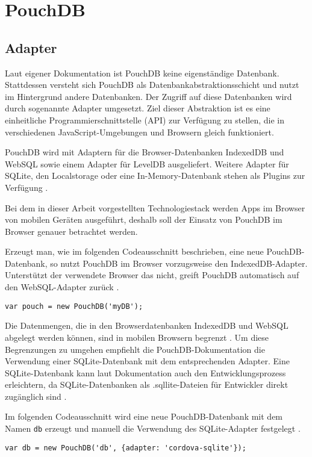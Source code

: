 \chapter{PouchDB}
\label{PouchDB}

\section{Adapter}
\label{Adapter}

Laut eigener Dokumentation ist PouchDB keine eigenständige Datenbank. Stattdessen versteht sich PouchDB als Datenbankabstraktionsschicht und nutzt im Hintergrund andere Datenbanken. Der Zugriff auf diese Datenbanken wird durch sogenannte Adapter umgesetzt. Ziel dieser Abstraktion ist es eine einheitliche Programmierschnittstelle (API) zur Verfügung zu stellen, die in verschiedenen JavaScript-Umgebungen und Browsern gleich funktioniert.

PouchDB wird mit Adaptern für die Browser-Datenbanken IndexedDB und WebSQL sowie einem Adapter für LevelDB ausgeliefert. Weitere Adapter für SQLite, den Localstorage oder eine In-Memory-Datenbank stehen als Plugins zur Verfügung \cite{pouch:adapters}.


Bei dem in dieser Arbeit vorgestellten Technologiestack werden Apps im Browser von mobilen Geräten ausgeführt, deshalb soll der Einsatz von PouchDB im Browser genauer betrachtet werden.

Erzeugt man, wie im folgenden Codeausschnitt beschrieben, eine neue PouchDB-Datenbank, so  nutzt PouchDB im Browser vorzugsweise den IndexedDB-Adapter. Unterstützt der verwendete Browser das nicht, greift PouchDB automatisch auf den WebSQL-Adapter zurück \cite{pouch:adapters}.
\begin{codebox}
\begin{lstlisting}[style=typescript]
var pouch = new PouchDB('myDB');
\end{lstlisting}
\end{codebox}


Die Datenmengen, die in den Browserdatenbanken IndexedDB und WebSQL abgelegt werden können, sind in mobilen Browsern begrenzt \cite{html5:quota}. Um diese Begrenzungen zu umgehen empfiehlt die PouchDB-Dokumentation die Verwendung einer SQLite-Datenbank mit dem entsprechenden Adapter. Eine SQLite-Datenbank kann laut Dokumentation auch den Entwicklungsprozess erleichtern, da SQLite-Datenbanken als .sqllite-Dateien für Entwickler direkt zugänglich sind \cite{pouch:adapters}.

Im folgenden Codeausschnitt wird eine neue PouchDB-Datenbank mit dem Namen \texttt{db} erzeugt und manuell die Verwendung des SQLite-Adapter festgelegt \cite{pouch:adapters}.
\begin{codebox}
\begin{lstlisting}[style=typescript]
var db = new PouchDB('db', {adapter: 'cordova-sqlite'});
\end{lstlisting}
\end{codebox}


